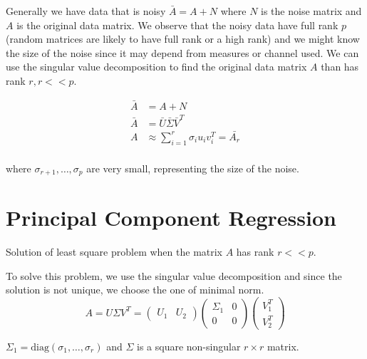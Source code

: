 Generally we have data that is noisy $\bar{A} = A + N$ where $N$ is the noise matrix and $A$ is the original data matrix.
We observe that the noisy data have full rank $p$ (random matrices are likely to have full rank or a high rank)
and we might know the size of the noise since it may depend from measures or
channel used. We can use the singular value decomposition to find the original data matrix $A$ than has rank $r, r << p$.

\[
\begin{aligned}
\bar{A} &= A + N \\
\bar{A} &= \bar{U}\bar{\Sigma}\bar{V}^T \\
A &\approx \sum_{i=1}^r \sigma_i u_i v_i^T = \bar{A_r} \\
\end{aligned}
\]

where $\sigma_{r+1}, \ldots, \sigma_p$ are very small, representing the size of the noise.
\section*{Principal Component Regression}
Solution of least square problem when the matrix $A$ has rank $r << p$.

To solve this problem, we use the singular value decomposition and since the solution is not unique,
we choose the one of minimal norm.
\[
A = U \Sigma V^T =
\begin{pmatrix} U_1 & U_2 \end{pmatrix}
\begin{pmatrix}
\Sigma_1 & 0 \\
0 & 0 
\end{pmatrix} \begin{pmatrix}
V_1^T \\
V_2^T
\end{pmatrix}
\]

$\Sigma_1 = \text{diag}(\sigma_1, \ldots, \sigma_r)$ and $\Sigma$ is a square non-singular $r \times r$ matrix.


